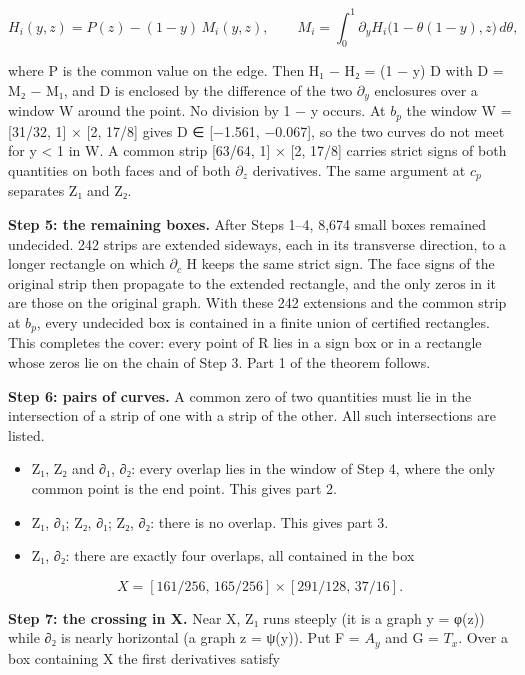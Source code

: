 \documentclass[
  11pt,
]{article}
\providecommand{\tightlist}{%
  \setlength{\itemsep}{0pt}\setlength{\parskip}{0pt}}
\begin{document}
\[
H_i(y,z)=P(z)-(1-y)\,M_i(y,z),\qquad M_i=\int_0^1\partial_yH_i\bigl(1-\theta(1-y),z\bigr)\,d\theta ,
\]

where P is the common value on the edge. Then H₁ − H₂ = (1 − y) D with D
= M₂ − M₁, and D is enclosed by the difference of the two
\(\partial_{y}\) enclosures over a window W around the point. No
division by 1 − y occurs. At \(b_{p}\) the window W = {[}31/32, 1{]} ×
{[}2, 17/8{]} gives D ∈ {[}−1.561, −0.067{]}, so the two curves do not
meet for y \textless{} 1 in W. A common strip {[}63/64, 1{]} × {[}2,
17/8{]} carries strict signs of both quantities on both faces and of
both \(\partial_{z}\) derivatives. The same argument at \(c_{p}\)
separates Z₁ and Z₂.

\textbf{Step 5: the remaining boxes.} After Steps 1--4, 8,674 small
boxes remained undecided. 242 strips are extended sideways, each in its
transverse direction, to a longer rectangle on which \(\partial_{c}\) H
keeps the same strict sign. The face signs of the original strip then
propagate to the extended rectangle, and the only zeros in it are those
on the original graph. With these 242 extensions and the common strip at
\(b_{p}\), every undecided box is contained in a finite union of
certified rectangles. This completes the cover: every point of R lies in
a sign box or in a rectangle whose zeros lie on the chain of Step 3.
Part 1 of the theorem follows.

\textbf{Step 6: pairs of curves.} A common zero of two quantities must
lie in the intersection of a strip of one with a strip of the other. All
such intersections are listed.

\begin{itemize}
\tightlist
\item
  Z₁, Z₂ and ∂₁, ∂₂: every overlap lies in the window of Step 4, where
  the only common point is the end point. This gives part 2.
\item
  Z₁, ∂₁; Z₂, ∂₁; Z₂, ∂₂: there is no overlap. This gives part 3.
\item
  Z₁, ∂₂: there are exactly four overlaps, all contained in the box
\end{itemize}

\[
X=[161/256,\,165/256]\times[291/128,\,37/16].
\]

\textbf{Step 7: the crossing in X.} Near X, Z₁ runs steeply (it is a
graph y = φ(z)) while ∂₂ is nearly horizontal (a graph z = ψ(y)). Put F
= \(A_{y}\) and G = \(T_{x}\). Over a box containing X the first
derivatives satisfy
\end{document}
